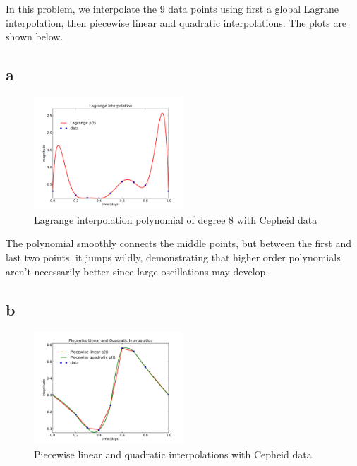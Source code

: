 \documentclass[11pt,letterpaper]{article}
\begin{document}
\section{}
In this problem, we interpolate the 9 data points using first a global
Lagrane interpolation, then piecewise linear and quadratic interpolations.
The plots are shown below.
\subsection*{a}

\begin{figure}[bth]
\centering
\includegraphics[width=0.5\textwidth]{lagrange_interpolation.pdf}
\caption{Lagrange interpolation polynomial of degree 8 with Cepheid data}
\label{fig:lagrange}
\end{figure}

The polynomial smoothly connects the middle points, but between the first and 
last two points, it jumps wildly, demonstrating that higher order polynomials
aren't necessarily better since large oscillations may develop.

\subsection*{b}

\begin{figure}[bth]
\centering
\includegraphics[width=0.5\textwidth]{linear_and_quadratic_interpolation.pdf}
\caption{Piecewise linear and quadratic interpolations with Cepheid data}
\label{fig:lin-quad}
\end{figure}
\end{document}
